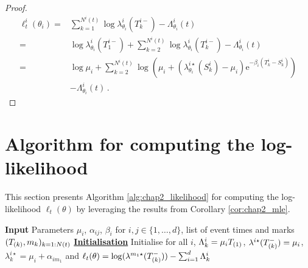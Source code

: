 \begin{subappendices}
\begin{proof}
            \begin{align*}
              \ell_t^{i}(\theta_i)
              = &\sum_{k=1}^{N^i(t)}{\log{\lambda^i_{\theta_i}(T_k^{i-})}} - \Lambda_{\theta_i}^i(t) \\
              = &\log{\lambda^i_{\theta_i}(T_1^{i-})} + \sum_{k=2}^{N^i(t)}{\log{\lambda^i_{\theta_i}(T_k^{i-})}} - \Lambda_{\theta_i}^i(t) \\
              = &\log{\mu_i} + \sum_{k=2}^{N^i(t)}{\log \left(\mu_i + \left(\lambda_{\theta_i}^{i\star}(S_k^i) - \mu_i\right)\mathrm{e}^{-\beta_i(T_k^{i}-S_k^i)} \right)}\\
              &- \Lambda_{\theta_i}^i(t) \,.
            \end{align*}
      \end{proof}
  
  
  \section{Algorithm for computing the log-likelihood}
  \label{app:chap2_log-lik}
  
  This section presents Algorithm \ref{alg:chap2_likelihood} for computing the log-likelihood $\ell_t(\theta)$ by leveraging the results from Corollary \ref{cor:chap2_mle}.
    \begin{algorithm}[!ht]
    \SetAlgoLined
     \textbf{Input} Parameters $\mu_i$, $\alpha_{ij}$, $\beta_i$ for $i,j\in\{1,\ldots, d\}$, list of event times and marks $(T\park, m_k)_{k=1:N(t)}$\;
     \textbf{\underline{Initialisation}} Initialise for all $i$, $\Lambda^i_k = \mu_i T\park[1]$, $\lambda^{i\star}(T\park^-) = \mu_i$, $\lambda_k^{i\star} = \mu_i + \alpha_{im_1}$ and $\ell_t(\theta) = \log(\lambda^{m_1\star}(T\park^-)) - \sum_{i=1}^{d}{\Lambda^i_k}$\;
\end{algorithm}
\end{subappendices}
